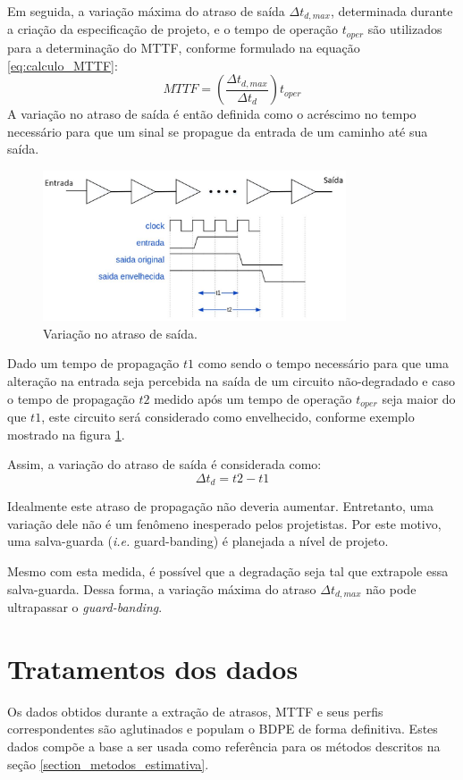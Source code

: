 Em seguida, a variação máxima do atraso de saída $\Delta t_{d,max}$, determinada durante a criação da especificação de projeto, e o tempo de operação $t_{oper}$ são utilizados para a determinação do MTTF, conforme formulado na equação \ref{eq:calculo_MTTF}:
\begin{equation}
MTTF = (\frac{\Delta t_{d,max}}{\Delta t_d})t_{oper}
\label{eq:calculo_MTTF}
\end{equation}
A variação no atraso de saída é então definida como o acréscimo no tempo necessário para que um sinal se propague da entrada de um caminho até sua saída.
\begin{figure}[H]
	\center
	\includegraphics[width=0.8\textwidth]{images/output_delay}
	\caption{Variação no atraso de saída.}
	\label{figure:output_delay}
\end{figure}
Dado um tempo de propagação $t1$ como sendo o tempo necessário para que uma alteração na entrada seja percebida na saída de um circuito não-degradado e caso o tempo de propagação $t2$ medido após um tempo de operação $t_{oper}$ seja maior do que $t1$, este circuito será considerado como envelhecido, conforme exemplo mostrado na figura \ref{figure:output_delay}.

Assim, a variação do atraso de saída é considerada como:
\begin{equation}
\Delta t_d = t2 - t1
\label{eq:variacao_delay_saida}
\end{equation}

Idealmente este atraso de propagação não deveria aumentar. Entretanto, uma variação dele não é um fenômeno inesperado pelos projetistas. Por este motivo, uma salva-guarda (\textit{i.e.} guard-banding)  é planejada a nível de projeto.

Mesmo com esta medida, é possível que a degradação seja tal que extrapole essa salva-guarda. Dessa forma, a variação máxima do atraso $\Delta t_{d,max}$ não pode ultrapassar o \textit{guard-banding}.

\section{Tratamentos dos dados}
\label{section_tratamento_dados}
Os dados obtidos durante a extração de atrasos, MTTF e seus perfis correspondentes são aglutinados e populam o BDPE de forma definitiva. Estes dados compõe a base a ser usada como referência para os métodos descritos na seção \ref{section_metodos_estimativa}.

